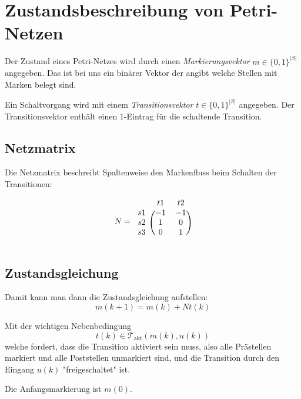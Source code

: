 \section{Zustandsbeschreibung von Petri-Netzen}

Der Zustand eines Petri-Netzes wird durch einen \emph{Markierungsvektor} $m \in \{0,1\}^{|S|}$ angegeben.
Das ist bei uns ein binärer Vektor der angibt welche Stellen mit Marken belegt sind.

Ein Schaltvorgang wird mit einem \emph{Transitionsvektor} $t \in \{0,1\}^{|S|}$ angegeben.
Der Transitionsvektor enthält einen $1$-Eintrag für die schaltende Transition.

\subsection{Netzmatrix}
Die Netzmatrix beschreibt Spaltenweise den Markenfluss beim Schalten der Transitionen:

\begin{equation}
    N =
    \begin{blockarray}{ccc}
        & t1 & t2 \\
        \begin{block}{c(cc)}
            s1 & -1 & -1 \\
            s2 &  1 &  0 \\
            s3 &  0 &  1 \\
        \end{block}
    \end{blockarray}
\end{equation}

\subsection{Zustandsgleichung}
Damit kann man dann die Zustandsgleichung aufstellen:
\begin{equation}
    m(k+1) = m(k) + N t(k)
\end{equation}

Mit der wichtigen Nebenbedingung
\begin{equation}
    t(k) \in \mathcal{T}_\text{akt}(m(k), u(k))
\end{equation}
welche fordert, dass die Transition aktiviert sein muss, also alle
Prästellen markiert und alle Poststellen unmarkiert sind, und die Transition
durch den Eingang $u(k)$ "freigeschaltet" ist.

Die Anfangsmarkierung ist $m(0)$.

